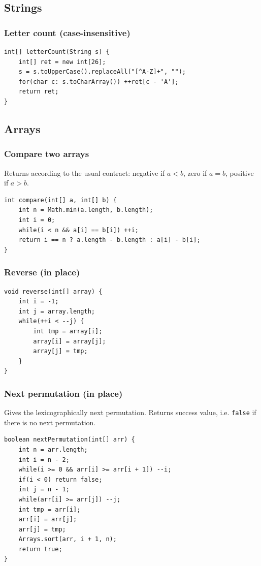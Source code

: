 \documentclass[a4paper,12pt]{article}
\begin{document}
\subsection{Strings}
\subsubsection{Letter count (case-insensitive)}
\begin{lstlisting}
int[] letterCount(String s) {
	int[] ret = new int[26];
	s = s.toUpperCase().replaceAll("[^A-Z]+", "");
	for(char c: s.toCharArray()) ++ret[c - 'A'];
	return ret;
}
\end{lstlisting}

\subsection{Arrays}
\subsubsection{Compare two arrays}
Returns according to the usual contract: negative if $a<b$, zero if $a=b$, positive if $a>b$.
\begin{lstlisting}
int compare(int[] a, int[] b) {
	int n = Math.min(a.length, b.length);
	int i = 0;
	while(i < n && a[i] == b[i]) ++i;
	return i == n ? a.length - b.length : a[i] - b[i];
}
\end{lstlisting}

\subsubsection{Reverse (in place)}
\begin{lstlisting}
void reverse(int[] array) {
	int i = -1;
	int j = array.length;
	while(++i < --j) {
		int tmp = array[i];
		array[i] = array[j];
		array[j] = tmp;
	}
}
\end{lstlisting}

\subsubsection{Next permutation (in place)}
Gives the lexicographically next permutation. Returns success value, i.e. \lstinline/false/ if there is no next permutation.
\begin{lstlisting}
boolean nextPermutation(int[] arr) {
	int n = arr.length;
	int i = n - 2;
	while(i >= 0 && arr[i] >= arr[i + 1]) --i;
	if(i < 0) return false;
	int j = n - 1;
	while(arr[i] >= arr[j]) --j;
	int tmp = arr[i];
	arr[i] = arr[j];
	arr[j] = tmp;
	Arrays.sort(arr, i + 1, n);
	return true;
}
\end{lstlisting}
\end{document}
